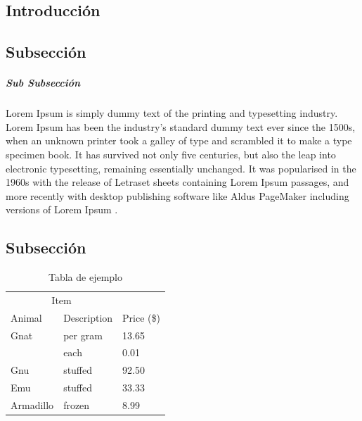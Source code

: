 \documentclass[11pt,fleqn]{article} %
\begin{document}
	\begin{multicols}{2}
		\setlength{\parindent}{0.5cm} %
				
		\section{Introducción} 
		
		\subsection{Subsección}
		
		\subparagraph{Sub Subsección}Lorem Ipsum is simply dummy text of the printing and typesetting industry. Lorem Ipsum has been the industry's standard dummy text ever since the 1500s, when an unknown printer took a galley of type and scrambled it to make a type specimen book. It has survived not only five centuries, but also the leap into electronic typesetting, remaining essentially unchanged. It was popularised in the 1960s with the release of Letraset sheets containing Lorem Ipsum passages, and more recently with desktop publishing software like Aldus PageMaker including versions of Lorem Ipsum \cite{article}. 
				
		\subsection{Subsección}
		
		\begin{table}[H]
			\centering
			\caption{Tabla de ejemplo}
			\label{Tabla_1}
			\begin{tabularx}{0.5\textwidth}{X X X} 
				\toprule %
				\multicolumn{2}{c}{Item} & \\ 
				\cmidrule(r){1-2} %
				Animal & Description & Price (\$)\\ 
				\midrule %
				Gnat & per gram & 13.65 \\
				& each & 0.01 \\
				Gnu & stuffed & 92.50 \\
				Emu & stuffed & 33.33 \\
				Armadillo & frozen & 8.99 \\ 
				\bottomrule %
			\end{tabularx}			
		\end{table}
		

\end{multicols}
\end{document}
